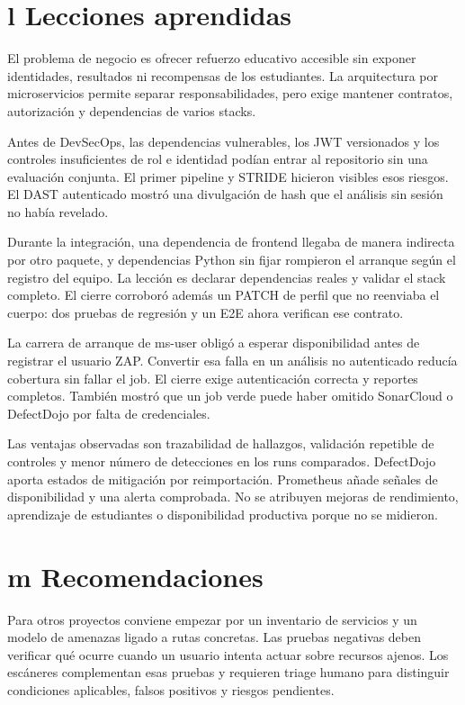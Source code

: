 \documentclass[12pt,a4paper]{article}
\begin{document}
\section*{l Lecciones aprendidas}
El problema de negocio es ofrecer refuerzo educativo accesible sin exponer identidades, resultados ni recompensas de los estudiantes. La arquitectura por microservicios permite separar responsabilidades, pero exige mantener contratos, autorización y dependencias de varios stacks.\par
Antes de DevSecOps, las dependencias vulnerables, los JWT versionados y los controles insuficientes de rol e identidad podían entrar al repositorio sin una evaluación conjunta. El primer pipeline y STRIDE hicieron visibles esos riesgos. El DAST autenticado mostró una divulgación de hash que el análisis sin sesión no había revelado.\par
Durante la integración, una dependencia de frontend llegaba de manera indirecta por otro paquete, y dependencias Python sin fijar rompieron el arranque según el registro del equipo. La lección es declarar dependencias reales y validar el stack completo. El cierre corroboró además un PATCH de perfil que no reenviaba el cuerpo: dos pruebas de regresión y un E2E ahora verifican ese contrato.\par
La carrera de arranque de ms-user obligó a esperar disponibilidad antes de registrar el usuario ZAP. Convertir esa falla en un análisis no autenticado reducía cobertura sin fallar el job. El cierre exige autenticación correcta y reportes completos. También mostró que un job verde puede haber omitido SonarCloud o DefectDojo por falta de credenciales.\par
Las ventajas observadas son trazabilidad de hallazgos, validación repetible de controles y menor número de detecciones en los runs comparados. DefectDojo aporta estados de mitigación por reimportación. Prometheus añade señales de disponibilidad y una alerta comprobada. No se atribuyen mejoras de rendimiento, aprendizaje de estudiantes o disponibilidad productiva porque no se midieron.\par
{}\section*{m Recomendaciones}
Para otros proyectos conviene empezar por un inventario de servicios y un modelo de amenazas ligado a rutas concretas. Las pruebas negativas deben verificar qué ocurre cuando un usuario intenta actuar sobre recursos ajenos. Los escáneres complementan esas pruebas y requieren triage humano para distinguir condiciones aplicables, falsos positivos y riesgos pendientes.\par
\end{document}
